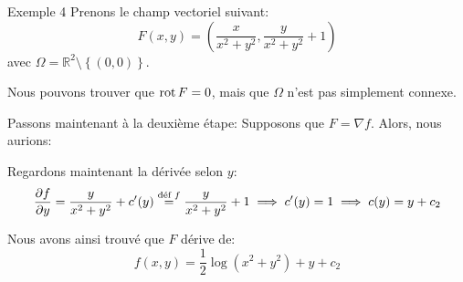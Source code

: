 \documentclass[a4paper]{article}
\begin{document}
\begin{parag}{Exemple 4}
    Prenons le champ vectoriel suivant: 
    \[F\left(x, y\right) = \left(\frac{x}{x^2 + y^2}, \frac{y}{x^2 + y^2} + 1\right)\]
    avec $\Omega = \mathbb{R}^2 \setminus \left\{\left(0, 0\right)\right\}$.

    Nous pouvons trouver que $\operatorname{rot} F = 0$, mais que $\Omega$ n'est pas simplement connexe. 

    Passons maintenant à la deuxième étape:  Supposons que $F = \nabla f$. Alors, nous aurions: 

    Regardons maintenant la dérivée selon $y$: 
    \[\frac{\partial f}{\partial y} = \frac{y}{x^2 + y^2} + c'\left(y\right) \over{=}{déf $f$}  \frac{y}{x^2 + y^2} + 1 \implies c'\left(y\right) = 1 \implies c\left(y\right) = y + c_2\]
    
    Nous avons ainsi trouvé que $F$ dérive de: 
    \[f\left(x, y\right) = \frac{1}{2} \log\left(x^2 + y^2\right) + y + c_2\]
\end{parag}
\end{document}
